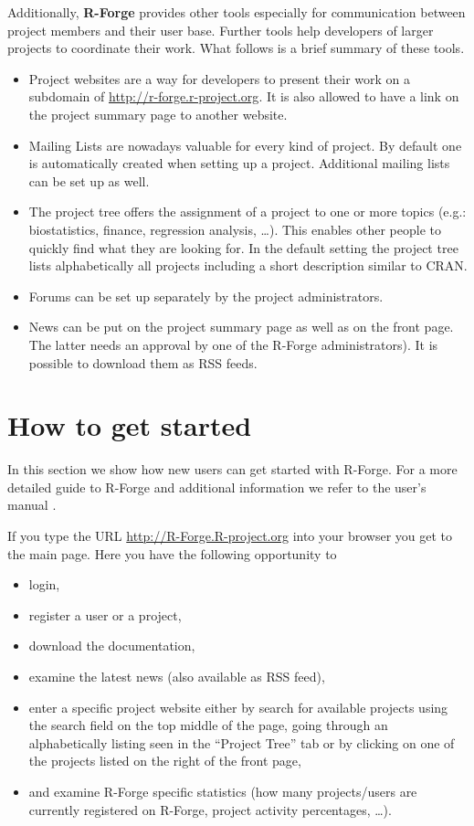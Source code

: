 Additionally, \textbf{R-Forge} provides other tools especially for
communication between project members and their user base. Further
tools help developers of larger projects to coordinate their work.
What follows is a brief summary of these tools.
\begin{itemize}
\item Project websites are a way for developers to present their work on a
subdomain of \url{http://r-forge.r-project.org}. It is also allowed to
have a link on the project summary page to another website. 
\item Mailing Lists are nowadays valuable for every kind of
  project. By default one is automatically created when setting up a
  project. Additional mailing lists can be set up as well. 
\item The project tree offers the assignment of a project to one or more
  topics (e.g.: biostatistics, finance, regression analysis,
  \ldots). This enables other people to quickly find what they are
  looking for. In the default setting the project tree lists
  alphabetically all projects including a short description similar to CRAN.
\item Forums can be set up separately by the project
  administrators.%
\item News can be put on the project summary page as well as on the
  front page. The latter needs an approval by one of the R-Forge
  administrators). It is possible to download them as RSS feeds.
\end{itemize}

\section{How to get started}
In this section we show how new users can get started with
R-Forge. For a more detailed guide to R-Forge and additional
information we refer to the user's manual
\cite{forge:theussl:2008}.

If you type the URL \url{http://R-Forge.R-project.org} into your
browser you get to the main page. Here you have the following
opportunity to
\begin{itemize}
\item login,
\item register a user or a project,
\item download the documentation,
\item examine the latest news (also available as RSS feed),
\item enter a specific project website either by search for available
  projects using the search field on the top middle of the page, going
  through an alphabetically listing seen in the
  ``Project Tree'' tab or by clicking on one of the projects listed on
  the right of the front page,
\item and examine R-Forge specific statistics (how many projects/users
  are currently registered on R-Forge, project activity percentages,
  \ldots{}).
\end{itemize}

